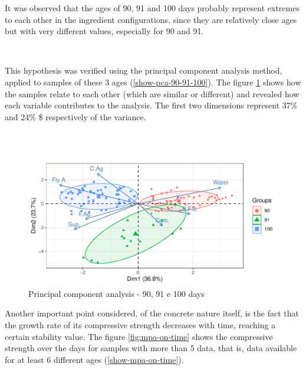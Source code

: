 \documentclass[]{article}
\begin{document}
It was observed that the ages of 90, 91 and 100 days probably represent
extremes to each other in the ingredient configurations, since they are
relatively close ages but with very different values, especially for 90
and 91.

~

This hypothesis was verified using the principal component analysis
method, applied to samples of these 3 ages (\ref{show-pca-90-91-100}).
The figure \ref{fig:pca-90-91-100} shows how the samples relate to each
other (which are similar or different) and revealed how each variable
contributes to the analysis. The first two dimensions represent 37\% and
24\% \$ respectively of the variance.

~

\begin{figure}

{\centering \includegraphics{CopyOfcapstone_files/figure-latex/pca-90-91-100-1} 

}

\caption{Principal component analysis - 90, 91 e 100 days}\label{fig:pca-90-91-100}
\end{figure}

Another important point considered, of the concrete nature itself, is
the fact that the growth rate of its compressive strength decreases with
time, reaching a certain stability value. The figure
\ref{fig:mpa-on-time} shows the compressive strength over the days for
samples with more than 5 data, that is, data available for at least 6
different ages (\ref{show-mpa-on-time}).

~
\end{document}
